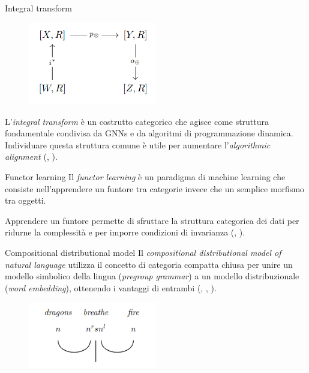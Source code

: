 \documentclass{beamer}
\begin{document}
\begin{frame}{Integral transform}

    \begin{figure}
        \begin{center}
            \includegraphics[width=0.5\textwidth]{figures/integral_transform.png}
            \caption*{\cite{dudzik2022graph}}
        \end{center}
    \end{figure}

    L'\textit{integral transform} è un costrutto categorico che agisce come struttura fondamentale condivisa da GNNs e da algoritmi di programmazione dinamica. Individuare questa struttura comune è utile per aumentare l'\textit{algorithmic alignment} (\cite{dudzik2022graph}, \cite{dudzik2024asynchronous}). 
\end{frame}

\begin{frame}{Functor learning}
    Il \textit{functor learning} è un paradigma di machine learning che consiste nell'apprendere un funtore tra categorie invece che un semplice morfismo tra oggetti.

    Apprendere un funtore permette di sfruttare la struttura categorica dei dati per ridurne la complessità e per imporre condizioni di invarianza (\cite{sheshmani2021categorical}, \cite{chytas2024poolingimagedatasetsmultiple}).
\end{frame}

\begin{frame}{Compositional distributional model}
    Il \textit{compositional distributional model of natural language} utilizza il concetto di categoria compatta chiusa per unire un modello simbolico della lingua (\textit{pregroup grammar}) a un modello distribuzionale (\textit{word embedding}), ottenendo i vantaggi di entrambi (\cite{clark2007combining}, \cite{coecke2010mathematical}, \cite{lewis2019compositionality}).

    \begin{figure}
        \begin{center}
            \includegraphics[width=0.5\textwidth]{figures/pregroup1.png}
            \caption*{\cite{lewis2019compositionality}}
        \end{center}
    \end{figure}
\end{frame}
\end{document}
